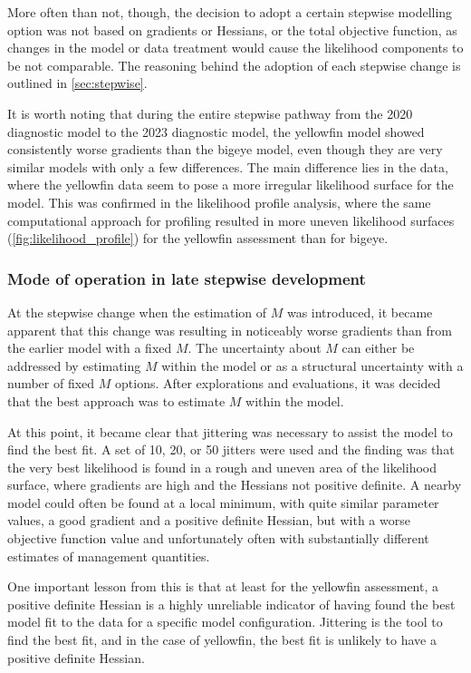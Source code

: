 More often than not, though, the decision to adopt a certain stepwise modelling option was not based on gradients or Hessians, or the total objective function, as changes in the model or data treatment would cause the likelihood components to be not comparable. The reasoning behind the adoption of each stepwise change is outlined in \autoref{sec:stepwise}.

It is worth noting that during the entire stepwise pathway from the 2020 diagnostic model to the 2023 diagnostic model, the yellowfin model showed consistently worse gradients than the bigeye model, even though they are very similar models with only a few differences. The main difference lies in the data, where the yellowfin data seem to pose a more irregular likelihood surface for the model. This was confirmed in the likelihood profile analysis, where the same computational approach for profiling resulted in more uneven likelihood surfaces (\autoref{fig:likelihood_profile}) for the yellowfin assessment than for bigeye.

\subsubsection{Mode of operation in late stepwise development}

At the stepwise change when the estimation of $M$ was introduced, it became apparent that this change was resulting in noticeably worse gradients than from the earlier model with a fixed $M$. The uncertainty about $M$ can either be addressed by estimating $M$ within the model or as a structural uncertainty with a number of fixed $M$ options. After explorations and evaluations, it was decided that the best approach was to estimate $M$ within the model.

At this point, it became clear that jittering was necessary to assist the model to find the best fit. A set of 10, 20, or 50 jitters were used and the finding was that the very best likelihood is found in a rough and uneven area of the likelihood surface, where gradients are high and the Hessians not positive definite. A nearby model could often be found at a local minimum, with quite similar parameter values, a good gradient and a positive definite Hessian, but with a worse objective function value and unfortunately often with substantially different estimates of management quantities.

One important lesson from this is that at least for the yellowfin assessment, a positive definite Hessian is a highly unreliable indicator of having found the best model fit to the data for a specific model configuration. Jittering is the tool to find the best fit, and in the case of yellowfin, the best fit is unlikely to have a positive definite Hessian.

